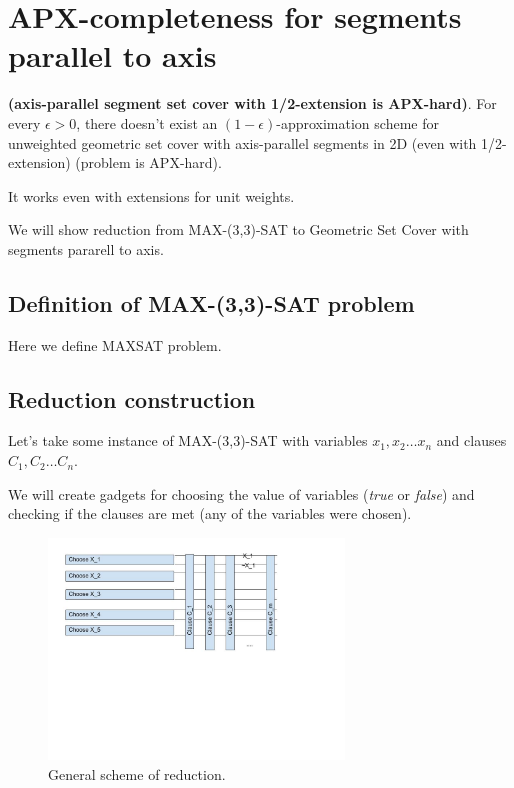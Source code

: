 \section{APX-completeness for segments parallel to axis}
\label{section:segment_apx}

\begin{tw}{
	\textbf{(axis-parallel segment set cover with 1/2-extension is APX-hard)}.	
	For every $\epsilon > 0$,
	there doesn't exist an $(1-\epsilon)$-approximation scheme
	for unweighted geometric set cover
	with axis-parallel segments in 2D (even with 1/2-extension)
	(problem is APX-hard).
}\end{tw}

It works even with extensions for unit weights.

We will show reduction from MAX-(3,3)-SAT
to Geometric Set Cover with segments pararell to axis.

\subsection{Definition of  MAX-(3,3)-SAT problem}
Here we define MAXSAT problem.

\subsection{Reduction construction}

Let's take some instance of  MAX-(3,3)-SAT with
variables $x_1, x_2 \ldots x_n$
and clauses $C_1, C_2 \dots C_n$.

We will create gadgets for choosing the value
of variables (\textit{true} or \textit{false}) and checking
if the clauses are met (any of the variables were chosen).

\begin{figure}[h]
\includegraphics[width=0.7\textwidth]{segment_apx_sketch.jpg}
\caption{General scheme of reduction.}
\label{fig:segment_apx}
\end{figure}


